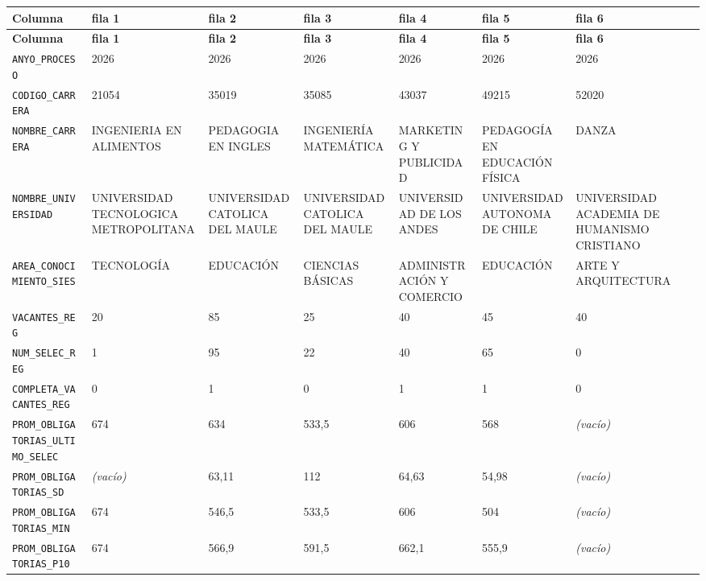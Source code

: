 \documentclass[10pt]{article}
\newcommand{\hdr}[1]{\textbf{\color{white}#1}}
\begin{document}
\footnotesize
\begin{xltabular}{\linewidth}{@{}p{4.3cm} Y Y Y Y Y Y @{}}
\hdr{Columna} & \hdr{fila 1} & \hdr{fila 2} & \hdr{fila 3} & \hdr{fila 4} & \hdr{fila 5} & \hdr{fila 6} \\
\endfirsthead
{}\hdr{Columna} & \hdr{fila 1} & \hdr{fila 2} & \hdr{fila 3} & \hdr{fila 4} & \hdr{fila 5} & \hdr{fila 6} \\
\endhead
{}\texttt{ANYO\_\allowbreak{}PROCESO} & 2026 & 2026 & 2026 & 2026 & 2026 & 2026 \\
\texttt{CODIGO\_\allowbreak{}CARRERA} & 21054 & 35019 & 35085 & 43037 & 49215 & 52020 \\
\texttt{NOMBRE\_\allowbreak{}CARRERA} & INGENIERIA EN ALIMENTOS & PEDAGOGIA EN INGLES & INGENIERÍA MATEMÁTICA & MARKETING Y PUBLICIDAD & PEDAGOGÍA EN EDUCACIÓN FÍSICA & DANZA \\
\texttt{NOMBRE\_\allowbreak{}UNIVERSIDAD} & UNIVERSIDAD TECNOLOGICA METROPOLITANA & UNIVERSIDAD CATOLICA DEL MAULE & UNIVERSIDAD CATOLICA DEL MAULE & UNIVERSIDAD DE LOS ANDES & UNIVERSIDAD AUTONOMA DE CHILE & UNIVERSIDAD ACADEMIA DE HUMANISMO CRISTIANO \\
\texttt{AREA\_\allowbreak{}CONOCIMIENTO\_\allowbreak{}SIES} & TECNOLOGÍA & EDUCACIÓN & CIENCIAS BÁSICAS & ADMINISTRACIÓN Y COMERCIO & EDUCACIÓN & ARTE Y ARQUITECTURA \\
\texttt{VACANTES\_\allowbreak{}REG} & 20 & 85 & 25 & 40 & 45 & 40 \\
\texttt{NUM\_\allowbreak{}SELEC\_\allowbreak{}REG} & 1 & 95 & 22 & 40 & 65 & 0 \\
\texttt{COMPLETA\_\allowbreak{}VACANTES\_\allowbreak{}REG} & 0 & 1 & 0 & 1 & 1 & 0 \\
\texttt{PROM\_\allowbreak{}OBLIGATORIAS\_\allowbreak{}ULTIMO\_\allowbreak{}SELEC} & 674 & 634 & 533,5 & 606 & 568 & \textit{\color{gris}(vacío)} \\
\texttt{PROM\_\allowbreak{}OBLIGATORIAS\_\allowbreak{}SD} & \textit{\color{gris}(vacío)} & 63,11 & 112 & 64,63 & 54,98 & \textit{\color{gris}(vacío)} \\
\texttt{PROM\_\allowbreak{}OBLIGATORIAS\_\allowbreak{}MIN} & 674 & 546,5 & 533,5 & 606 & 504 & \textit{\color{gris}(vacío)} \\
\texttt{PROM\_\allowbreak{}OBLIGATORIAS\_\allowbreak{}P10} & 674 & 566,9 & 591,5 & 662,1 & 555,9 & \textit{\color{gris}(vacío)} \\

\end{xltabular}
\end{document}
